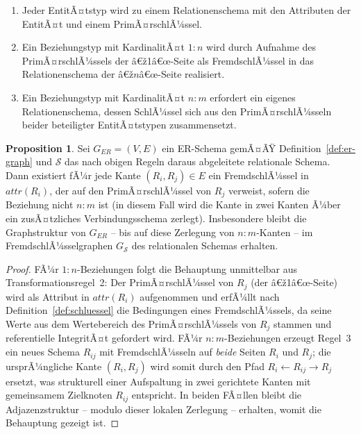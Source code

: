 ﻿\documentclass[a4paper,12pt]{report}
\theoremstyle{definition}
\newtheorem{proposition}[theorem]{Proposition}
\theoremstyle{remark}
\newcommand{\att}{\mathit{attr}}
\begin{document}
\begin{enumerate}
  \item Jeder EntitÃ¤tstyp wird zu einem Relationenschema mit den
    Attributen der EntitÃ¤t und einem PrimÃ¤rschlÃ¼ssel.
  \item Ein Beziehungstyp mit KardinalitÃ¤t $1{:}n$ wird durch Aufnahme
    des PrimÃ¤rschlÃ¼ssels der â€ž1â€œ-Seite als FremdschlÃ¼ssel in das
    Relationenschema der â€ž$n$â€œ-Seite realisiert.
  \item Ein Beziehungstyp mit KardinalitÃ¤t $n{:}m$ erfordert ein eigenes
    Relationenschema, dessen SchlÃ¼ssel sich aus den PrimÃ¤rschlÃ¼sseln
    beider beteiligter EntitÃ¤tstypen zusammensetzt.
\end{enumerate}

\begin{proposition}
\label{prop:er-rel-graph}
Sei $G_{ER}=(V,E)$ ein ER-Schema gemÃ¤ÃŸ Definition~\ref{def:er-graph} und
$\mathcal{S}$ das nach obigen Regeln daraus abgeleitete relationale
Schema. Dann existiert fÃ¼r jede Kante $(R_i,R_j)\in E$ ein
FremdschlÃ¼ssel in $\att(R_i)$, der auf den PrimÃ¤rschlÃ¼ssel von $R_j$
verweist, sofern die Beziehung nicht $n{:}m$ ist (in diesem Fall wird
die Kante in zwei Kanten Ã¼ber ein zusÃ¤tzliches Verbindungsschema
zerlegt). Insbesondere bleibt die Graphstruktur von $G_{ER}$ -- bis auf
diese Zerlegung von $n{:}m$-Kanten -- im FremdschlÃ¼sselgraphen
$G_{\mathcal{S}}$ des relationalen Schemas erhalten.
\end{proposition}

\begin{proof}
FÃ¼r $1{:}n$-Beziehungen folgt die Behauptung unmittelbar aus
Transformationsregel~2: Der PrimÃ¤rschlÃ¼ssel von $R_j$ (der â€ž1â€œ-Seite)
wird als Attribut in $\att(R_i)$ aufgenommen und erfÃ¼llt nach
Definition~\ref{def:schluessel} die Bedingungen eines FremdschlÃ¼ssels,
da seine Werte aus dem Wertebereich des PrimÃ¤rschlÃ¼ssels von $R_j$
stammen und referentielle IntegritÃ¤t gefordert wird. FÃ¼r $n{:}m$-Beziehungen
erzeugt Regel~3 ein neues Schema $R_{ij}$ mit FremdschlÃ¼sseln auf
\emph{beide} Seiten $R_i$ und $R_j$; die ursprÃ¼ngliche Kante
$(R_i,R_j)$ wird somit durch den Pfad $R_i \leftarrow R_{ij} \rightarrow R_j$
ersetzt, was strukturell einer Aufspaltung in zwei gerichtete Kanten mit
gemeinsamem Zielknoten $R_{ij}$ entspricht. In beiden FÃ¤llen bleibt die
Adjazenzstruktur -- modulo dieser lokalen Zerlegung -- erhalten, womit die
Behauptung gezeigt ist.
\end{proof}
\end{document}
